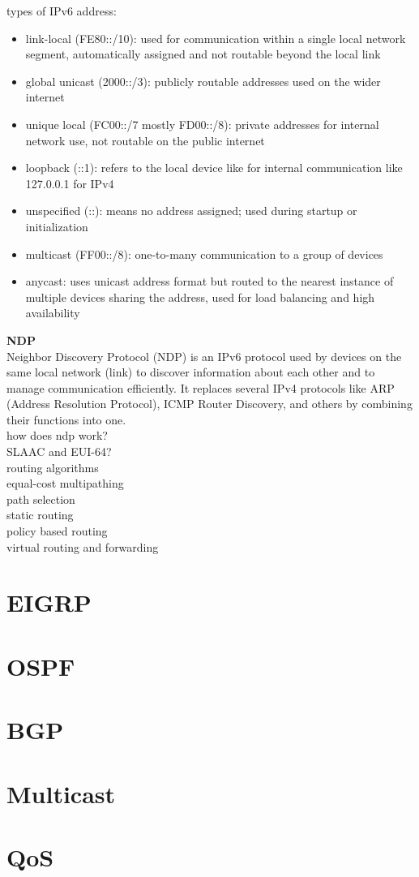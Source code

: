 \documentclass{article}
\begin{document}
types of IPv6 address:
	\begin{itemize}
		\item link-local (FE80::/10): used for communication within a single local network segment, automatically assigned and not routable beyond the local link
		\item global unicast (2000::/3): publicly routable addresses used on the wider internet
		\item unique local (FC00::/7 mostly FD00::/8): private addresses for internal network use, not routable on the public internet
		\item loopback (::1): refers to the local device like for internal communication like 127.0.0.1 for IPv4
		\item unspecified (::): means no address assigned; used during startup or initialization
		\item multicast (FF00::/8): one-to-many communication to a group of devices
		\item anycast: uses unicast address format but routed to the nearest instance of multiple devices sharing the address, used for load balancing and high availability
	\end{itemize}

\textbf{NDP}\\
Neighbor Discovery Protocol (NDP) is an IPv6 protocol used by devices on the same local network (link) to discover information about each other and to manage communication efficiently. It replaces several IPv4 protocols like ARP (Address Resolution Protocol), ICMP Router Discovery, and others by combining their functions into one.\\

how does ndp work?\\
SLAAC and EUI-64?\\

routing algorithms\\
equal-cost multipathing\\
path selection\\
static routing\\
policy based routing\\
virtual routing and forwarding\\

\section*{EIGRP}
\section*{OSPF}
\section*{BGP}
\section*{Multicast}
\section*{QoS}





 
\end{document}

